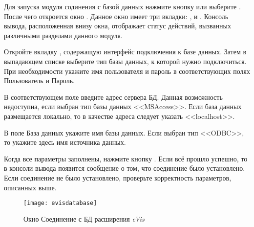 \label{evis_launch_database}

Для запуска модуля содинения с базой данных нажмите кнопку
 или выберите  \arrow
{} \arrow {}.
После чего откроется окно . Данное окно имеет
три вкладки: ,  и
. Консоль вывода, расположенная внизу окна, отображает
статус действий, вызванных различными разделами данного модуля.

\label{evis_connect_database}

Откройте вкладку , содержащую интерфейс подключения
к базе данных. Затем в выпадающем списке 
выберите тип базы данных, к которой нужно подключиться. При необходимости
укажите имя пользователя и пароль в соответствующих полях Пользователь и
Пароль.

В соответствующем поле введите адрес сервера БД. Данная возможность
недоступна, если выбран тип базы данных <<MSAccess>>. Если база данных
размещается локально, то в качестве адреса следует указать <<localhost>>.

В поле База данных укажите имя базы данных. Если выбран тип <<ODBC>>, то
укажите здесь имя источника данных.

Когда все параметры заполнены, нажмите кнопку . Если всё
прошло успешно, то в консоли вывода появится сообщение о том, что соединение
было установлено. Если соединение не было установлено, проверьте корректность
параметров, описанных выше.

\begin{figure}[ht]
   \centering
   \texttt{[image: evisdatabase]}
   \caption{\label{evisdatabase}Окно Соединение с БД расширения \emph{eVis} \wincaption}
\end{figure}

